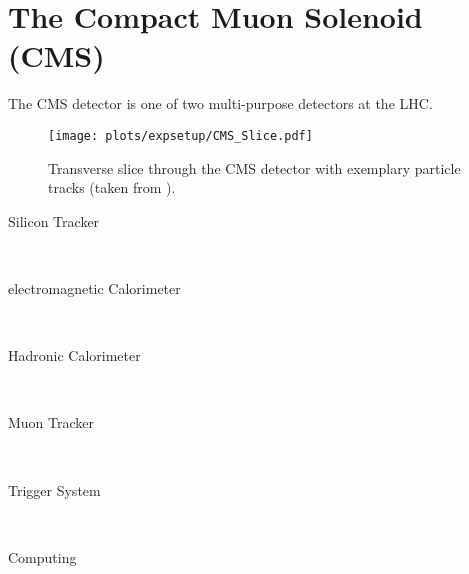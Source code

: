 \section{The Compact Muon Solenoid (CMS)}
The CMS detector is one of two multi-purpose detectors at the LHC. 
\begin{figure}
	\centering
	\texttt{[image: plots/expsetup/CMS\_Slice.pdf]}
	\caption[Transverse slice through the CMS detector]{Transverse slice through the CMS detector with exemplary particle tracks (taken from \cite{cms_slice}).}
	\label{fig:expsetup:cms_slice}
\end{figure}
\begin{description}
\item[Silicon Tracker] \hfill \\
\item[electromagnetic Calorimeter] \hfill \\
\item[Hadronic Calorimeter] \hfill \\
\item[Muon Tracker] \hfill \\
\item[Trigger System] \hfill \\
\item[Computing] \hfill \\
\end{description}